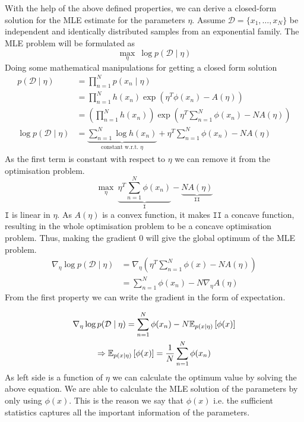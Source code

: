 \documentclass{homework}
\begin{document}
\section{}
With the help of the above defined properties, we can derive a closed-form solution for the MLE estimate for the parameters $\eta$. Assume $\mathcal D = \{x_1,\dots,x_N\}$ be independent and identically distributed samples from an exponential family. 
The MLE problem will be formulated as 
$$
\max_{\eta} \ \log p(\mathcal D\mid \eta)
$$
Doing some mathematical manipulations for getting a closed form solution
$$
\begin{aligned}
p(\mathcal D \mid \eta) &= \prod_{n=1}^N p(x_n\mid \eta) \\
&= \prod_{n=1}^N h(x_n) \exp\left(\eta^T\phi(x_n) - A(\eta)\right)\\
&= \left(\prod_{n=1}^N h(x_n)\right)\exp\left(\eta^T\sum_{n=1}^N \phi(x_n) - NA(\eta)\right)
\\ \log p(\mathcal D \mid \eta) &= \underbrace{\sum_{n=1}^N\log h(x_n)}_{\text{constant w.r.t. $\eta$}} + \eta^T\sum_{n=1}^N \phi(x_n) - NA(\eta)
\end{aligned}
$$
As the first term is constant with respect to $\eta$ we can remove it from the optimisation problem.
$$
\max_{\eta} \ \underbrace{\eta^T\sum_{n=1}^N \phi(x_n)}_{\mathtt{I}} - \underbrace{NA(\eta)}_{\mathtt{II}}
$$
$\mathtt{I}$ is linear in $\eta$. As $A(\eta)$ is a convex function, it makes $\mathtt{II}$ a concave function, resulting in the whole optimisation problem to be a concave optimisation problem. Thus, making the gradient $0$ will give the global optimum of the MLE problem.
$$
\begin{aligned}
\nabla_\eta \log p(\mathcal D\mid \eta) &=\nabla_\eta\left(\eta^T \sum_{n=1}^N \phi(x) - NA(\eta)\right) \\
&= \sum_{n=1}^N\phi(x_n) - N\nabla_\eta A(\eta)
\end{aligned}
$$
From the first property we can write the gradient in the form of expectation.

\begin{gather*}
\nabla_\eta \log p(\mathcal D\mid \eta) = \sum_{n=1}^N\phi(x_n) - N\mathbb{E}_{p(x\mid \eta)}\left[\phi(x)\right] \\
\Rightarrow \mathbb{E}_{p(x\mid \eta)}\left[\phi(x)\right] = {1\over N}\sum_{n=1}^N\phi(x_n)
\end{gather*}
As left side is a function of $\eta$ we can calculate the optimum value by solving the above equation.
We are able to calculate the MLE solution of the parameters by only using $\phi(x)$. This is the reason we say that $\phi(x)$ i.e. the sufficient statistics captures all the important information of the parameters.
\end{document}
